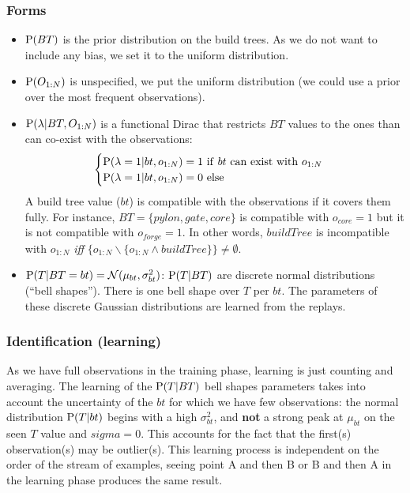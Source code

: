 \subsubsection{Forms}
\begin{itemize}
\item $\mathrm{P}(BT)$ is the prior distribution on the build trees. As we do not want to include any bias, we set it to the uniform distribution.

\item $\mathrm{P}(O_{1:N})$ is unspecified, we put the uniform distribution (we could use a prior over the most frequent observations).

\item $\mathrm{P}(\lambda | BT, O_{1:N})$ is a functional Dirac that restricts $BT$ values to the ones than can co-exist with the observations:
\begin{eqnarray*}
\begin{cases}
\PP(\lambda = 1 | bt, o_{1:N}) = 1\ \mathrm{if\ } bt \ \mathrm{can\ exist\ with\ } o_{1:N} \\
\PP(\lambda = 1 | bt, o_{1:N}) = 0\ \mathrm{else}
\end{cases}
\end{eqnarray*}
A build tree value ($bt$) is compatible with the observations if it covers them fully. For instance, $BT=\{pylon, gate, core\}$ is compatible with $o_{core} = 1$ but it is not compatible with $o_{forge} = 1$. In other words, $buildTree$ is incompatible with $o_{1:N}$ \textit{iff} $\{o_{1:N} \backslash \{o_{1:N} \wedge buildTree\}\} \neq \emptyset$.

\item $\mathrm{P}(T|BT=bt) = \mathcal{N}(\mu_{bt},\sigma_{bt}^2)$: $\mathrm{P}(T | BT)$ are discrete normal distributions (``bell shapes''). 
There is one bell shape over $T$ per $bt$. The parameters of these discrete Gaussian distributions are learned from the replays.
\end{itemize}

\subsubsection{Identification (learning)}
As we have full observations in the training phase, learning is just counting and averaging. The learning of the $\mathrm{P}(T | BT)$ bell shapes parameters takes into account the uncertainty of the $bt$ for which we have few observations: the normal distribution $\mathrm{P}(T|bt)$ begins with a high $\sigma_{bt}^2$, and \textbf{not} a strong peak at $\mu_{bt}$ on the seen $T$ value and $sigma=0$. This accounts for the fact that the first(s) observation(s) may be outlier(s). This learning process is independent on the order of the stream of examples, seeing point A and then B or B and then A in the learning phase produces the same result. 

